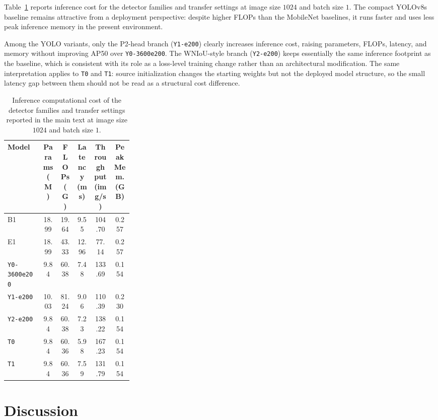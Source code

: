 \documentclass[cmc,article,submit,moreauthors,pdftex]{Definitions/tsp}
\begin{document}
Table~\ref{tab:efficiency} reports inference cost for the detector families and transfer settings at image size $1024$ and batch size $1$. The compact YOLOv8s baseline remains attractive from a deployment perspective: despite higher FLOPs than the MobileNet baselines, it runs faster and uses less peak inference memory in the present environment.

Among the YOLO variants, only the P2-head branch (\texttt{Y1-e200}) clearly increases inference cost, raising parameters, FLOPs, latency, and memory without improving AP50 over \texttt{Y0-3600e200}. The WNIoU-style branch (\texttt{Y2-e200}) keeps essentially the same inference footprint as the baseline, which is consistent with its role as a loss-level training change rather than an architectural modification. The same interpretation applies to \texttt{T0} and \texttt{T1}: source initialization changes the starting weights but not the deployed model structure, so the small latency gap between them should not be read as a structural cost difference.

\begin{table}[ht]
  \centering
  \caption{Inference computational cost of the detector families and transfer settings reported in the main text at image size $1024$ and batch size $1$.}
  \label{tab:efficiency}
  \footnotesize
  \setlength{\tabcolsep}{4pt}
  \begin{tabularx}{\linewidth}{>{\raggedright\arraybackslash}p{0.29\linewidth} c c c c c}
    \toprule
    Model & Params (M) & FLOPs (G) & Latency (ms) & Throughput (img/s) & Peak Mem. (GB) \\
    \midrule
    B1 & 18.99 & 19.64 & 9.55 & 104.70 & 0.257 \\
    E1 & 18.99 & 43.33 & 12.96 & 77.14 & 0.257 \\
    \texttt{Y0-3600e200} & 9.84 & 60.38 & 7.48 & 133.69 & 0.154 \\
    \texttt{Y1-e200} & 10.03 & 81.24 & 9.06 & 110.39 & 0.230 \\
    \texttt{Y2-e200} & 9.84 & 60.38 & 7.23 & 138.22 & 0.154 \\
    \texttt{T0} & 9.84 & 60.36 & 5.98 & 167.23 & 0.154 \\
    \texttt{T1} & 9.84 & 60.36 & 7.59 & 131.79 & 0.154 \\
    \bottomrule
  \end{tabularx}
\end{table}

\section{Discussion}
\label{sec:discussion}
\end{document}
